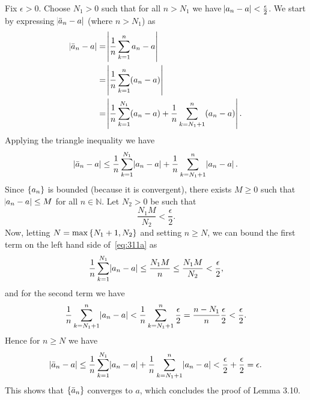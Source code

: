 \documentclass{article}
\newcommand{\N}{\mathbb{N}}
\begin{document}
Fix $\epsilon > 0$. Choose $N_1 > 0$ such that for all $n > N_1$ we
have $\envert{a_n - a} < \frac{\epsilon}{2}$. We start by expressing
$\envert{\bar{a}_n - a}$  (where $n > N_1$) as
%
\begin{align*}
    \envert{\bar{a}_n - a}
        &= \envert{\frac{1}{n} \sum_{k = 1}^{n} a_n - a } \\
        &= \envert{\frac{1}{n} \sum_{k = 1}^{n} (a_n - a)} \\
        &= \envert{
            \frac{1}{n} \sum_{k = 1}^{N_1} (a_n - a)
            +
            \frac{1}{n} \sum_{k = N_1 + 1}^{n} (a_n - a)
        }
        .
\end{align*}
%
Applying the triangle inequality we have
%
\begin{equation}
    \envert{\bar{a}_n - a}
        \leq
            \frac{1}{n} \sum_{k = 1}^{N_1} \envert{a_n - a}
            +
            \frac{1}{n} \sum_{k = N_1 + 1}^{n} \envert{a_n - a}
        \label{eq:311a}
        .
\end{equation}
%
Since $\cbr{a_n}$ is bounded (because it is convergent), there exists
$M \geq 0$ such that $\envert{a_n - a} \leq M$ for all $n \in \N$. Let
$N_2 > 0$ be such that
%
\begin{equation*}
    \frac{N_1 M}{N_2} < \frac{\epsilon}{2}
    .
\end{equation*}
%
Now, letting $N = \max \cbr{N_1 + 1, N_2}$ and setting $n \geq N$, we
can bound the first term on the left hand side of~\eqref{eq:311a} as
%
\begin{equation*}
    \frac{1}{n} \sum_{k = 1}^{N_1} \envert{a_n - a}
    \leq \frac{N_1 M}{n}
    \leq \frac{N_1 M}{N_2}
    < \frac{\epsilon}{2}
    ,
\end{equation*}
%
and for the second term we have
%
\begin{equation*}
    \frac{1}{n} \sum_{k = N_1 + 1}^{n} \envert{a_n - a}
    < \frac{1}{n} \sum_{k = N_1 + 1}^{n} \frac{\epsilon}{2}
    = \frac{n - N_1}{n} \frac{\epsilon}{2}
    < \frac{\epsilon}{2}
    .
\end{equation*}
%
Hence for $n \geq N$ we have
%
\begin{equation*}
    \envert{\bar{a}_n - a}
        \leq
            \frac{1}{n} \sum_{k = 1}^{N_1} \envert{a_n - a}
            +
            \frac{1}{n} \sum_{k = N_1 + 1}^{n} \envert{a_n - a}
        < \frac{\epsilon}{2} + \frac{\epsilon}{2} = \epsilon
        .
\end{equation*}
%
This shows that $\cbr{\bar{a}_n}$ converges to $a$, which concludes the
proof of Lemma 3.10.
\end{document}
